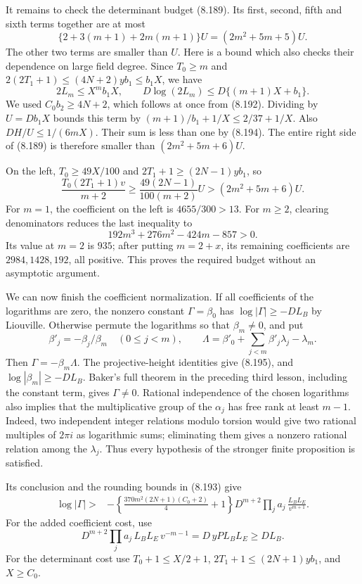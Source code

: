 \documentclass[
  11pt,
  a4paper,
]{article}
\begin{document}
It remains to check the determinant budget (8.189). Its first, second,
fifth and sixth terms together are at most \[
\{2+3(m+1)+2m(m+1)\}U=(2m^2+5m+5)U.
\] The other two terms are smaller than \(U\). Here is a bound which
also checks their dependence on large field degree. Since \(T_0\ge m\)
and \(2(2T_1+1)\le(4N+2)yb_1\le b_1X\), we have \[
2L_m\le X^m b_1X,\qquad
D\log(2L_m)
\le D\{(m+1)X+b_1\}.
\] We used \(C_0b_2\ge4N+2\), which follows at once from (8.192).
Dividing by \(U=Db_1X\) bounds this term by
\((m+1)/b_1+1/X\le2/37+1/X\). Also \(DH/U\le1/(6mX)\). Their sum is less
than one by (8.194). The entire right side of (8.189) is therefore
smaller than \((2m^2+5m+6)U\).

On the left, \(T_0\ge49X/100\) and \(2T_1+1\ge(2N-1)yb_1\), so \[
\frac{T_0(2T_1+1)v}{m+2}
\ge\frac{49(2N-1)}{100(m+2)}U
>(2m^2+5m+6)U.
\] For \(m=1\), the coefficient on the left is \(4655/300>13\). For
\(m\ge2\), clearing denominators reduces the last inequality to \[
192m^3+276m^2-424m-857>0.
\] Its value at \(m=2\) is \(935\); after putting \(m=2+x\), its
remaining coefficients are \(2984,1428,192\), all positive. This proves
the required budget without an asymptotic argument.

We can now finish the coefficient normalization. If all coefficients of
the logarithms are zero, the nonzero constant \(\Gamma=\beta_0\) has
\(\log|\Gamma|\ge-DL_B\) by Liouville. Otherwise permute the logarithms
so that \(\beta_m\ne0\), and put \[
\beta'_j=-\beta_j/\beta_m\quad(0\le j<m),\qquad
\Lambda=\beta'_0+\sum_{j<m}\beta'_j\lambda_j-\lambda_m.
\] Then \(\Gamma=-\beta_m\Lambda\). The projective-height identities
give (8.195), and \(\log|\beta_m|\ge-DL_B\). Baker's full theorem in the
preceding third lesson, including the constant term, gives
\(\Gamma\ne0\). Rational independence of the chosen logarithms also
implies that the multiplicative group of the \(\alpha_j\) has free rank
at least \(m-1\). Indeed, two independent integer relations modulo
torsion would give two rational multiples of \(2\pi i\) as logarithmic
sums; eliminating them gives a nonzero rational relation among the
\(\lambda_j\). Thus every hypothesis of the stronger finite proposition
is satisfied.

Its conclusion and the rounding bounds in (8.193) give \[
\begin{split}
\log|\Gamma|>{}&
-\left\{\frac{370m^2(2N+1)(C_0+2)}4+1\right\}
D^{m+2}\prod_ja_j\,
\frac{L_BL_E}{v^{m+1}}.
\end{split}
\tag{8.197}
\] For the added coefficient cost, use \[
D^{m+2}\prod_ja_j\,L_BL_E\,v^{-m-1}
=D\,yP L_BL_E\ge DL_B.
\] For the determinant cost use \(T_0+1\le X/2+1\),
\(2T_1+1\le(2N+1)yb_1\), and \(X\ge C_0\).
\end{document}
